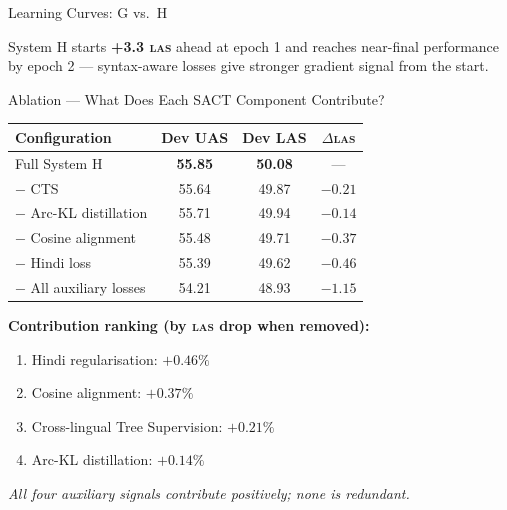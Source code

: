 \documentclass[aspectratio=169,10pt]{beamer}
\newcommand{\hi}{Hindi}
\newcommand{\las}{\textsc{las}}
\begin{document}
\begin{frame}{Learning Curves: G vs.\ H}
\centering
{}

\vspace{0.1cm}
\small System H starts \textbf{+3.3 \las{}} ahead at epoch 1 and reaches near-final performance by epoch 2
--- syntax-aware losses give stronger gradient signal from the start.
\end{frame}

\begin{frame}{Ablation --- What Does Each SACT Component Contribute?}
\centering
\begin{tabular}{@{}lcc c@{}}
\toprule
\textbf{Configuration} & \textbf{Dev UAS} & \textbf{Dev LAS} & $\Delta$\las{} \\
\midrule
Full System H                    & \textbf{55.85} & \textbf{50.08} & --- \\
\quad $-$ CTS                    & 55.64 & 49.87 & $-0.21$ \\
\quad $-$ Arc-KL distillation    & 55.71 & 49.94 & $-0.14$ \\
\quad $-$ Cosine alignment       & 55.48 & 49.71 & $-0.37$ \\
\quad $-$ \hi{} loss             & 55.39 & 49.62 & $-0.46$ \\
\quad $-$ All auxiliary losses   & 54.21 & 48.93 & $-1.15$ \\
\bottomrule
\end{tabular}

\vspace{0.6cm}
\textbf{Contribution ranking (by \las{} drop when removed):}
\begin{enumerate}
  \item \hi{} regularisation: $+0.46\%$
  \item Cosine alignment: $+0.37\%$
  \item Cross-lingual Tree Supervision: $+0.21\%$
  \item Arc-KL distillation: $+0.14\%$
\end{enumerate}

\centering
\vspace{0.1cm}
\emph{All four auxiliary signals contribute positively; none is redundant.}
\end{frame}
\end{document}
